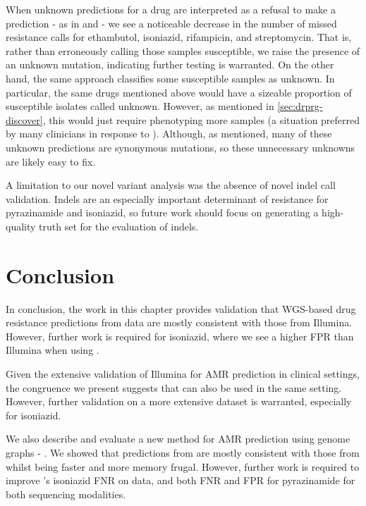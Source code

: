 When unknown predictions for a drug are interpreted as a refusal to make a prediction - as in \cite{cryptic2018} and \cite{hunt2019} - we see a noticeable decrease in the number of missed resistance calls for ethambutol, isoniazid, rifampicin, and streptomycin. That is, rather than erroneously calling those samples susceptible, we raise the presence of an unknown mutation, indicating further testing is warranted. On the other hand, the same approach classifies some susceptible samples as unknown. In particular, the same drugs mentioned above would have a sizeable proportion of susceptible isolates called unknown. However, as mentioned in \autoref{sec:drprg-discover}, this would just require phenotyping more samples (a situation preferred by many clinicians in response to \cite{hunt2019}). Although, as mentioned, many of these unknown predictions are synonymous mutations, so these unnecessary unknowns are likely easy to fix.

A limitation to our novel variant analysis was the absence of novel indel call validation. Indels are an especially important determinant of resistance for pyrazinamide and isoniazid, so future work should focus on generating a high-quality truth set for the evaluation of \drprg{} indels.

\section{Conclusion}
In conclusion, the work in this chapter provides validation that WGS-based drug resistance predictions from \ont{} data are mostly consistent with those from Illumina. However, further work is required for isoniazid, where we see a higher FPR than Illumina when using \mykrobe{}.

Given the extensive validation of Illumina for \mtb{} AMR prediction in clinical settings, the congruence we present suggests that \ont{} can also be used in the same setting. However, further validation on a more extensive dataset is warranted, especially for isoniazid. 

We also describe and evaluate a new method for AMR prediction using genome graphs - \drprg{}. We showed that predictions from \drprg{} are mostly consistent with those from \mykrobe{} whilst being faster and more memory frugal. However, further work is required to improve \drprg{}'s isoniazid FNR on \ont{} data, and both FNR and FPR for pyrazinamide for both sequencing modalities.

